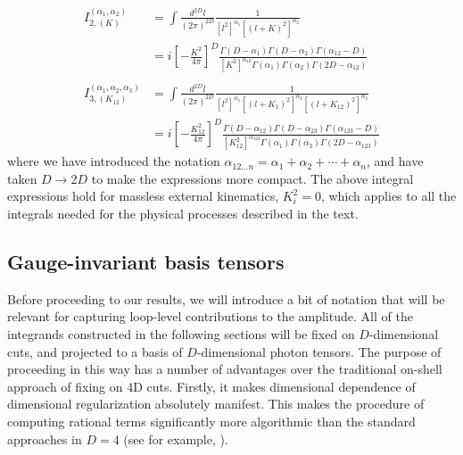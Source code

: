\documentclass[12pt,letter]{article}
\def\be{\begin{equation}}
\def\ee{\end{equation}}
\begin{document}
\be\label{eq:integrals}
\boxed{
\begin{aligned}
I_{2,(K)}^{(\alpha_1,\alpha_2)}&=\int \frac{d^{2D} l}{(2\pi)^{2D}} \frac{1}{[l^2]^{\alpha_1}[(l+K)^2]^{\alpha_2}} 
\\
&=i\left[-\frac{K^2}{4\pi}\right]^D\frac{\Gamma(D-\alpha_1)\Gamma(D-\alpha_2)\Gamma(\alpha_{12}-D)}{[K^2]^{\alpha_{12}}\Gamma(\alpha_1)\Gamma(\alpha_2)\Gamma(2D-\alpha_{12})} 
 \\\\
I_{3,(K_{12})}^{(\alpha_1,\alpha_2,\alpha_3)}&= \int \frac{d^{2D} l}{(2\pi)^{2D}} \frac{1}{[l^2]^{\alpha_1}[(l+K_1)^2]^{\alpha_2}[(l+K_{12})^2]^{\alpha_3}} 
\\
&=i\left[-\frac{K_{12}^2}{4\pi}\right]^D\frac{\Gamma(D-\alpha_{12})\Gamma(D-\alpha_{23})\Gamma(\alpha_{123}-D)}{[K_{12}^2]^{\alpha_{123}}\Gamma(\alpha_1)\Gamma(\alpha_3)\Gamma(2D-\alpha_{123})} 
\end{aligned}
}
\ee
where we have introduced the notation $\alpha_{12...n} = \alpha_1+\alpha_2+\cdots +\alpha_n$, and have taken $D\rightarrow 2D$ to make the expressions more compact. The above integral expressions hold for massless external kinematics, $K_i^2=0$, which applies to all the integrals needed for the physical processes described in the text. 
\subsection{Gauge-invariant basis tensors}\label{sec:basisT}
Before proceeding to our results, we will introduce a bit of notation that will be relevant for capturing loop-level contributions to the amplitude. All of the integrands constructed in the following sections will be fixed on $D$-dimensional cuts, and projected to a basis of $D$-dimensional photon tensors. The purpose of proceeding in this way has a number of advantages over the traditional on-shell approach of fixing on 4D cuts. Firstly, it makes dimensional dependence of dimensional regularization absolutely manifest. This makes the procedure of computing rational terms significantly more algorithmic than the standard approaches in $D=4$ (see for example, \cite{Badger:2008cm}). 
\end{document}
